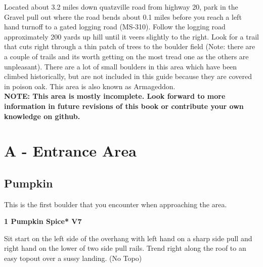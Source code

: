 

\raggedcolumns
\begin{multicols}{2}

Located about 3.2 miles down quatzville road from highway 20, park in the Gravel pull out where the road bends about 0.1 miles before you reach a left hand turnoff to a gated logging road (MS-310). Follow the logging road approximately 200 yards up hill until it veers slightly to the right. Look for a trail that cuts right through a thin patch of trees to the boulder field (Note: there are a couple of trails and its worth getting on the most tread one as the others are unpleasant). There are a lot of small boulders in this area which have been climbed historically, but are not included in this guide because they are covered in poison oak. This area is also known as Armageddon.\\

\textbf{NOTE: This area is mostly incomplete. Look forward to more information in future revisions of this book or contribute your own knowledge on github.}\\

\newpage

		\section{A - Entrance Area}\label{sa:Entrance Area}
	
	
			\subsection*{Pumpkin}\label{bf:Pumpkin}
			This is the first boulder that you encounter when approaching the area.\\
			
					\label{rt:Pumpkin Spice}
\colorbox{Goldenrod!50}{
\parbox{0.95\linewidth}{
\textbf{
1 Pumpkin Spice* V7    
}
}
}

					\begin{adjustwidth}{0.5cm}{}				
					Sit start on the left side of the overhang with left hand on a sharp side pull and right hand on the lower of two side pull rails. Trend right along the roof to an easy topout over a sussy landing.
						\newline (No Topo) 
					\end{adjustwidth}

\end{multicols}
